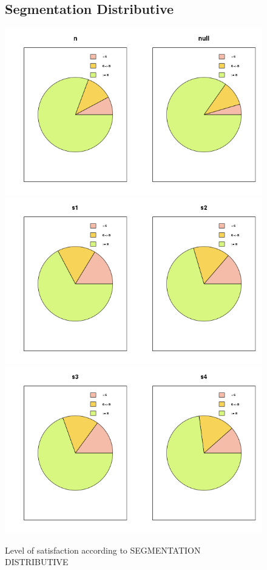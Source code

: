 \documentclass[a4paper, 11pt]{article}
\begin{document}
        \begin{figure}[!ht]
        \subsection{Segmentation Distributive}
        	\centering
                \includegraphics[width = 10 cm]{Remi/Level_of_satisfaction_according_to_SEGMENTATION_DISTRIBUTIVE4.png}
                \includegraphics[width = 10 cm]{Remi/Level_of_satisfaction_according_to_SEGMENTATION_DISTRIBUTIVE6.png}
                \includegraphics[width = 10 cm]{Remi/Level_of_satisfaction_according_to_SEGMENTATION_DISTRIBUTIVE8.png}
                \caption{Level of satisfaction according to SEGMENTATION DISTRIBUTIVE}
                \label{fig:SEGMENTATION_DISTRIBUTIVE8}
        \end{figure}
\end{document}
